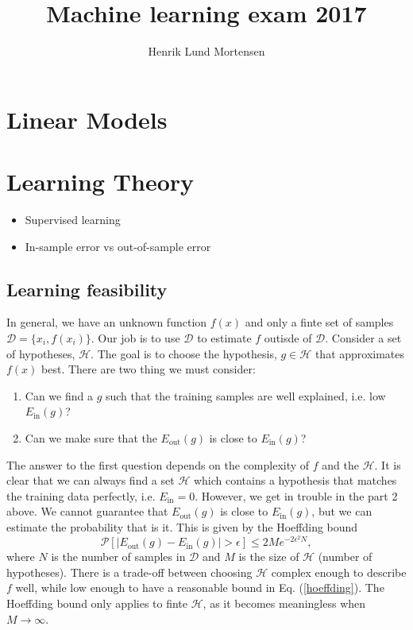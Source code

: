 \documentclass[oneside]{memoir}
\title{Machine learning exam 2017}
\author{Henrik Lund Mortensen}
\begin{document}
\maketitle

\section{Linear Models}
\section{Learning Theory}


\begin{itemize}
\item Supervised learning
\item In-sample error vs out-of-sample error
\end{itemize}

\subsection{Learning feasibility}
In general, we have an unknown function $f(x)$ and only a finte set of samples $\mathcal{D} = \{ x_i,f(x_i)\}$. Our job is to use $\mathcal{D}$ to estimate $f$ outisde of $\mathcal{D}$. Consider a set of hypotheses, $\mathcal{H}$. The goal is to choose the hypothesis, $g \in \mathcal{H}$ that approximates $f(x)$ best. There are two thing we must consider:

\begin{enumerate}
\item Can we find a $g$ such that the training samples are well explained, i.e. low $E_\text{in}(g)$?
\item Can we make sure that the $E_\text{out}(g)$ is close to $E_\text{in}(g)$?
\end{enumerate}
The answer to the first question depends on the complexity of $f$ and the $\mathcal{H}$. It is clear that we can always find a set $\mathcal{H}$ which contains a hypothesis that matches the training data perfectly, i.e. $E_{\text{in}} = 0$. However, we get in trouble in the part 2 above. We cannot guarantee that $E_\text{out}(g)$ is close to $E_\text{in}(g)$, but we can estimate the probability that is it. This is given by the Hoeffding bound
\begin{equation}
  \label{hoeffding}
\mathcal{P}\left[ |E_\text{out}(g) - E_\text{in}(g)| > \epsilon\right] \leq 2M e^{-2\epsilon^2N},
\end{equation}
where $N$ is the number of samples in $\mathcal{D}$ and $M$ is the size of $\mathcal{H}$ (number of hypotheses). There is a trade-off between choosing $\mathcal{H}$ complex enough to describe $f$ well, while low enough to have a reasonable bound in Eq. (\ref{hoeffding}). The Hoeffding bound only applies to finte $\mathcal{H}$, as it becomes meaningless when $M\rightarrow \infty$.
\end{document}
